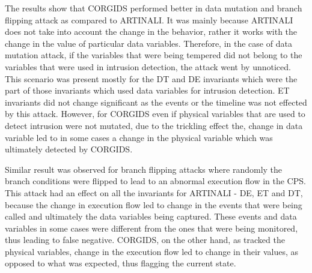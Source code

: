 \begin{table}
\centering
  \caption{Results of intrusion detection by \ac{CORGIDS} for Arbitrary attacks on \ac{SAP} platform}
  \label{tab:CORGIDS_SAP_ARBITRARY}
\end{table}

The results show that \ac{CORGIDS} performed better in data mutation and branch flipping attack as compared to ARTINALI. It was mainly because ARTINALI does not take into account the change in the behavior, rather it works with the change in the value of particular data variables. Therefore, in the case of data mutation attack, if the variables that were being tempered did not belong to the variables that were used in intrusion detection, the attack went by unnoticed. This scenario was present mostly for the D\textbar T and D\textbar E invariants which were the part of those invariants which used data variables for intrusion detection. E\textbar T invariants did not change significant as the events or the timeline was not effected by this attack. However, for \ac{CORGIDS} even if physical variables that are used to detect intrusion were not mutated, due to the trickling effect the, change in data variable led to in some cases a change in the physical variable which was ultimately detected by \ac{CORGIDS}.

Similar result was observed for branch flipping attacks where randomly the branch conditions were flipped to lead to an abnormal execution flow in the \ac{CPS}. This attack had an effect on all the invariants for ARTINALI -  D\textbar E, E\textbar T and D\textbar T, because the change in execution flow led to change in the events that were being called and ultimately the data variables being captured. These events and data variables in some cases were different from the ones that were being monitored, thus leading to false negative. \ac{CORGIDS}, on the other hand, as tracked the physical variables, change in the execution flow led to change in their values, as opposed to what was expected, thus flagging the current state.

